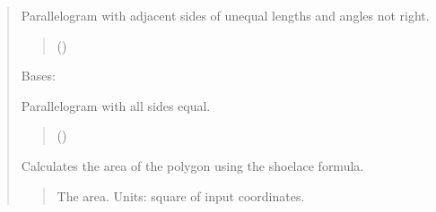 \documentclass[letterpaper,10pt,english]{sphinxmanual}
\begin{document}
\begin{quote}
\begin{fulllineitems}
\sphinxAtStartPar
Parallelogram with adjacent sides of unequal lengths and angles not right.
\begin{quote}\begin{description}
\sphinxAtStartPar
{} ()

\end{description}\end{quote}

\end{fulllineitems}


\begin{fulllineitems}
\label{\detokenize{pygeox:pygeox.custom_objects.Rhombus}}
\pysigstartsignatures
\pysiglinewithargsret
{}
{\sphinxparamcomma {}\sphinxparamcomma {}\sphinxparamcomma {}\sphinxparamcomma {}\sphinxparamcomma {}\sphinxparamcomma {}\sphinxparamcomma {}}
{}
\pysigstopsignatures
\sphinxAtStartPar
Bases: 

\sphinxAtStartPar
Parallelogram with all sides equal.
\begin{quote}\begin{description}
\sphinxAtStartPar
{} ()

\end{description}\end{quote}

\begin{fulllineitems}
\label{\detokenize{pygeox:pygeox.custom_objects.Rhombus.area}}
\pysigstartsignatures
\pysigline
{}
\pysigstopsignatures
\sphinxAtStartPar
Calculates the area of the polygon using the shoelace formula.
\begin{quote}\begin{description}
\sphinxAtStartPar
The area. Units: square of input coordinates.


\end{description}
\end{quote}
\end{fulllineitems}
\end{fulllineitems}
\end{quote}
\end{document}
